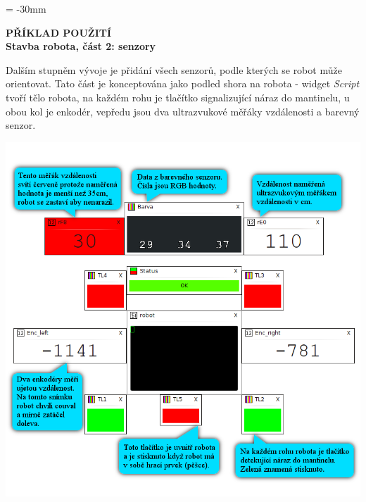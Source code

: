 \documentclass[12pt, a4paper, oneside]{article}
\newcommand{\B}{\textbf} %
\newcommand{\It}{\textit}  %
\begin{document}
\newpage
\voffset = -30mm %
\begin{center}
    \Large \B{PŘÍKLAD POUŽITÍ \\ Stavba robota, část 2: senzory}
\end{center}
\vspace{5mm}
Dalším stupněm vývoje je přidání všech senzorů, podle kterých se robot může orientovat. Tato část je konceptována jako podled shora na robota - widget \It{Script} tvoří tělo robota, na každém rohu je tlačítko signalizující náraz do mantinelu, u obou kol je enkodér, vepředu jsou dva ultrazvukové měřáky vzdálenosti a barevný senzor.
\begin{center}
\includegraphics[scale=0.85]{img/sensors2.png}
\end{center}
\end{document}
